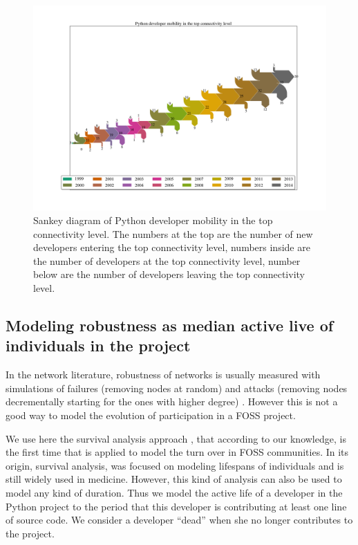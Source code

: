 \begin{landscape}
\begin{figure}[p]
\begin{center}
\includegraphics[scale=0.42]{figures/sankey_mobility_python_years}
\caption[Sankey diagram of Python developer mobility in the top connectivity level.]{Sankey diagram of Python developer mobility in the top connectivity level. The numbers at the top are the number of new developers entering the top connectivity level, numbers inside are the number of developers at the top connectivity level, number below are the number of developers leaving the top connectivity level.}
\label{fig:sankey}
\end{center}
\end{figure}
\end{landscape}


\subsection{Modeling robustness as median active live of individuals in the project}

In the network literature, robustness of networks is usually measured with simulations of failures (removing nodes at random) and attacks (removing nodes decrementally starting for the ones with higher degree) \citep{albert:2000}. However this is not a good way to model the evolution of participation in a FOSS project.

We use here the survival analysis approach \citep{miller:2011}, that according to our knowledge, is the first time that is applied to model the turn over in FOSS communities. In its origin, survival analysis, was focused on modeling lifespans of individuals and is still widely used in medicine. However, this kind of analysis can also be used to model any kind of duration. Thus we model the active life of a developer in the Python project to the period that this developer is contributing at least one line of source code. We consider a developer ``dead'' when she no longer contributes to the project.

